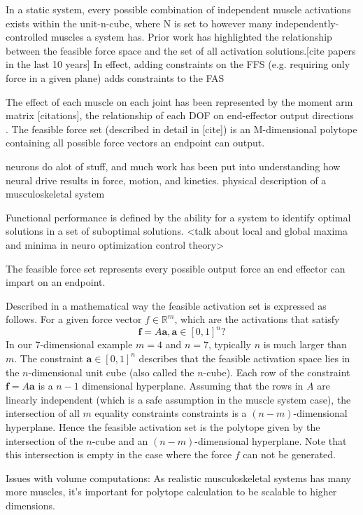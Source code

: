 In a static system, every possible combination of independent muscle activations exists within the unit-n-cube, where N is set to however many independently-controlled muscles a system has.
Prior work has highlighted the relationship between the feasible force space and the set of all activation solutions.[cite papers in the last 10 years]
In effect, adding constraints on the FFS (e.g. requiring only force in a given plane) adds constraints to the FAS

The effect of each muscle on each joint has been represented by the moment arm matrix [citations], the relationship of each DOF on end-effector output directions .
The feasible force set (described in detail in [cite]) is an M-dimensional polytope containing all possible force vectors an endpoint can output.

neurons do alot of stuff, and much work has been put into understanding how neural drive results in force, motion, and kinetics. 
physical description of a musculoskeletal system


Functional performance is defined by the ability for a system to identify optimal solutions in a set of suboptimal solutions. 
<talk about local and global maxima and minima in neuro optimization control theory>

The feasible force set represents every possible output force an end effector can impart on an endpoint.






Described in a mathematical way the feasible activation set is expressed as follows. For a given force vector $f \in \mathbb{R}^m$, which are the activations that satisfy
\[\textbf{f} = A\textbf{a}, \textbf{a} \in [0,1]^n?\]
In our 7-dimensional example $m =4$ and $n =7$, typically $n$ is much larger than $m$.
The constraint $\textbf{a} \in [0,1]^n$ describes that the feasible activation space lies in the $n$-dimensional unit cube (also called the $n$-cube). Each row of the constraint $\textbf{f} = A\textbf{a}$ is a $n-1$ dimensional hyperplane. Assuming that the rows in $A$ are linearly independent (which is a safe assumption in the muscle system case), the intersection of all $m$ equality constraints constraints is a $(n-m)$-dimensional hyperplane. Hence the feasible activation set is the polytope given by the intersection of the $n$-cube and an $(n-m)$-dimensional hyperplane. Note that this intersection is empty in the case where the force $f$ can not be generated.


Issues with volume computations:
As realistic musculoskeletal systems has many more muscles, it's important for polytope calculation to be scalable to higher dimensions.



